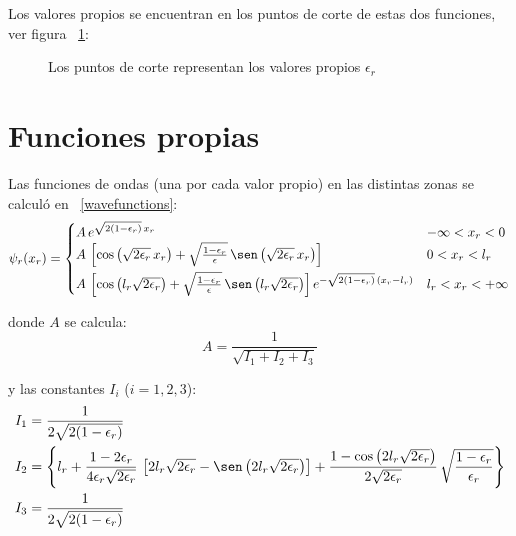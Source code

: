 Los valores propios se encuentran en los puntos de corte de estas dos
funciones, ver figura ~\ref{fig:eigenvalues}:

\begin{figure}[ht]
\centering
{}
\caption{Los puntos de corte representan los valores propios $\epsilon_r$}
\label{fig:eigenvalues}
\end{figure}

\section{Funciones propias}
Las funciones de ondas (una por cada valor propio) en las distintas zonas se
calculó en ~\ref{wavefunctions}:
\[
\psi_r(x_r)=
\begin{cases}
A\,e^{\sqrt{2(1-\epsilon_r)}\,x_r}
& -\infty<x_r<0\\
A\,\left[\cos\left(\sqrt{2\epsilon_r}\,x_r\right)
  + \sqrt{\frac{1-\epsilon_r}{\epsilon}}\,
    \sen\left(\sqrt{2\epsilon_r}\,x_r\right)\right]
& 0<x_r<l_r\phantom{\rule[-10pt]{0em}{0em}}\\
A\,\left[\cos\left(l_r\sqrt{2\epsilon_r}\right)
  + \sqrt{\frac{1-\epsilon_r}{\epsilon}}\,
    \sen\left(l_r\sqrt{2\epsilon_r}\right)\right]
    e^{-\sqrt{2(1-\epsilon_r)}\,(x_r-l_r)}
& l_r<x_r<+\infty
\end{cases}
\]

donde $A$ se calcula:
\[
A = \frac{1}{\sqrt{I_1 + I_2 + I_3}}
\]

y las constantes $I_i$ ($i=1,2,3$):
\begin{align*}
&I_1 = \frac{1}{2\sqrt{2(1-\epsilon_r)}}\\
&I_2 
= 
\left\lbrace
l_r
+
\frac{1-2\epsilon_r}{4\epsilon_r\sqrt{2\epsilon_r}}\,
\left[
2l_r\sqrt{2\epsilon_r}
- \sen\left(2l_r\sqrt{2\epsilon_r}\right)
\right]
+
\frac{1 - \cos\left(2l_r\sqrt{2\epsilon_r}\right)}
{2\sqrt{2\epsilon_r}}\,
\sqrt{\frac{1-\epsilon_r}{\epsilon_r}}
\right\rbrace\\
&I_3 = \frac{1}{2\sqrt{2(1-\epsilon_r)}}
\end{align*}

